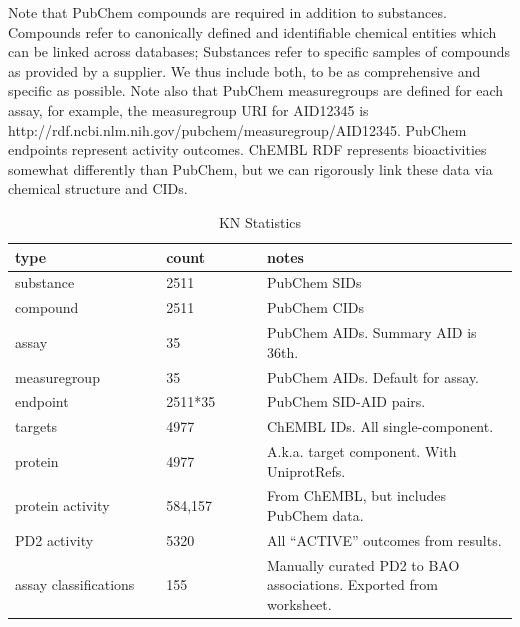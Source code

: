 Note that PubChem compounds are required in addition to substances.  Compounds refer to canonically defined and identifiable chemical entities which can be linked across databases; Substances refer to specific samples of compounds as provided by a supplier.  We thus include both, to be as comprehensive and specific as possible.   Note also that PubChem measuregroups are defined for each assay, for example, the measuregroup URI for AID12345 is http://rdf.ncbi.nlm.nih.gov/pubchem/measuregroup/AID12345.  PubChem endpoints represent activity outcomes.  ChEMBL RDF represents bioactivities somewhat differently than PubChem, but we can rigorously link these data via chemical structure and CIDs.

\begin{table}[]
\caption{KN Statistics}
\label{tab:opddr_03}
\centering
\begin{tabular}{p{0.3\linewidth}p{0.2\linewidth}p{0.5\linewidth}}
\hline
\textbf{type} & \textbf{count} & \textbf{notes} \\
\hline
substance & 2511 & PubChem SIDs \\
compound & 2511 & PubChem CIDs \\
assay & 35 & PubChem AIDs.  Summary AID is 36th. \\
measuregroup & 35 & PubChem AIDs.  Default for assay. \\
endpoint & 2511*35 & PubChem SID-AID pairs. \\
targets & 4977 & ChEMBL IDs.  All single-component. \\
protein & 4977 & A.k.a. target component.  With UniprotRefs. \\
protein activity & 584,157 & From ChEMBL, but includes PubChem data. \\
PD2 activity & 5320 & All “ACTIVE” outcomes from results. \\
assay classifications & 155 & Manually curated PD2 to BAO associations.  Exported from worksheet. \\
\hline
\end{tabular}
\end{table}

